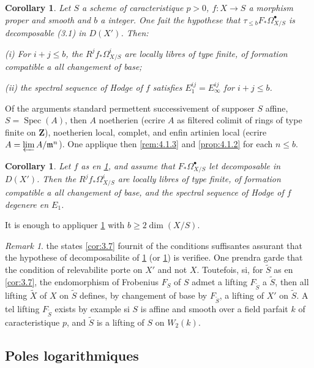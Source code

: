 \documentclass[12pt,a4paper]{article}
\theoremstyle{plain}
\newtheorem{corollary}[theorem]{Corollary}
\theoremstyle{definition}
\theoremstyle{remark}
\newtheorem{remark}[theorem]{Remark}
\DeclareMathOperator{\Spec}{Spec}
\begin{document}
\begin{corollary}\label{cor:4.1.4}
Let $S$ a scheme of caracteristique $p > 0$, $f: X \to S$ a morphism proper and smooth and $b$ a integer. One fait the hypothese that $\tau_{\le b} F_* \Omega^{\bullet}_{X/S}$ is decomposable \textup{(3.1)} in $D(X')$. Then:

\textup{(i)} For $i + j \le b$, the $R^j f_* \Omega^i_{X/S}$ are locally libres of type finite, of formation compatible a all changement of base;

\textup{(ii)} the spectral sequence of Hodge of $f$ satisfies $E_1^{ij} = E_\infty^{ij}$ for $i + j \le b$.
\end{corollary}

Of the arguments standard permettent successivement of supposer $S$ affine, $S = \Spec(A)$, then $A$ noetherien (ecrire $A$ as filtered colimit of rings of type finite on $\mathbf{Z}$), noetherien local, complet, and enfin artinien local (ecrire $A = \varprojlim A/\mathfrak{m}^n$). One applique then \ref{rem:4.1.3} and \ref{prop:4.1.2} for each $n \le b$.

\begin{corollary}\label{cor:4.1.5}
Let $f$ as en \ref{cor:4.1.4}, and assume that $F_* \Omega^{\bullet}_{X/S}$ let decomposable in $D(X')$. Then the $R^j f_* \Omega^i_{X/S}$ are locally libres of type finite, of formation compatible a all changement of base, and the spectral sequence of Hodge of $f$ degenere en $E_1$.
\end{corollary}

It is enough to appliquer \ref{cor:4.1.4} with $b \ge 2 \dim(X/S)$.

\begin{remark}\label{rem:4.1.6}
the states \ref{cor:3.7} fournit of the conditions suffisantes assurant that the hypothese of decomposabilite of \ref{cor:4.1.4} (or \ref{cor:4.1.5}) is verifiee. One prendra garde that the condition of relevabilite porte on $X'$ and not $X$. Toutefois, si, for $\tilde{S}$ as en \ref{cor:3.7}, the endomorphism of Frobenius $F_S$ of $S$ admet a lifting $F_{\tilde{S}}$ a $\tilde{S}$, then all lifting $\tilde{X}$ of $X$ on $\tilde{S}$ defines, by changement of base by $F_{\tilde{S}}$, a lifting of $X'$ on $\tilde{S}$. A tel lifting $F_{\tilde{S}}$ exists by example si $S$ is affine and smooth over a field parfait $k$ of caracteristique $p$, and $\tilde{S}$ is a lifting of $S$ on $W_2(k)$.
\end{remark}

\subsection{Poles logarithmiques}
\end{document}
